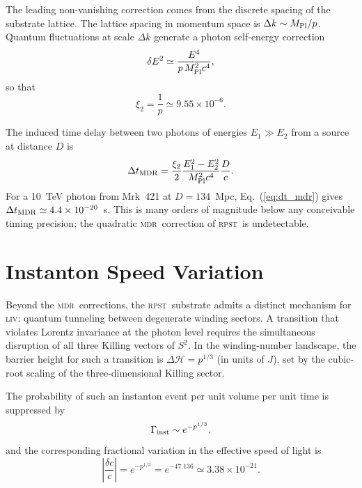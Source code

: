 \documentclass[aps,prd,twocolumn,showpacs,preprintnumbers]{revtex4-2}
\newcommand{\rpst}{\textsc{rpst}}
\newcommand{\Mpl}{M_{\rm Pl}}
\newcommand{\MDR}{\textsc{mdr}}
\newcommand{\LIV}{\textsc{liv}}
\newcommand{\abs}[1]{\left|#1\right|}
\begin{document}
The leading non-vanishing correction comes from the discrete spacing of the
substrate lattice.  The lattice spacing in momentum space is $\Delta k \sim
\Mpl/p$.  Quantum fluctuations at scale $\Delta k$ generate a photon
self-energy correction
\begin{equation}
  \delta E^2 \simeq \frac{E^4}{p\,\Mpl^2 c^4},
\end{equation}
so that
\begin{equation}
  \xi_2 = \frac{1}{p} \simeq 9.55 \times 10^{-6}.
\label{eq:xi2}
\end{equation}

The induced time delay between two photons of energies $E_1 \gg E_2$ from a
source at distance $D$ is
\begin{equation}
  \Delta t_{\rm MDR}
    = \frac{\xi_2}{2}\frac{E_1^2 - E_2^2}{\Mpl^2 c^4}\frac{D}{c}.
\label{eq:dt_mdr}
\end{equation}
For a 10~TeV photon from Mrk~421 at $D = 134$~Mpc,
Eq.~(\ref{eq:dt_mdr}) gives $\Delta t_{\rm MDR} \simeq 4.4 \times 10^{-20}$~s.
This is many orders of magnitude below any conceivable timing precision;
the quadratic \MDR\ correction of \rpst\ is undetectable.

\section{Instanton Speed Variation}
\label{sec:instanton}

Beyond the \MDR\ corrections, the \rpst\ substrate admits a distinct mechanism
for \LIV: quantum tunneling between degenerate winding sectors.  A transition
that violates Lorentz invariance at the photon level requires the simultaneous
disruption of all three Killing vectors of $S^2$.  In the winding-number
landscape, the barrier height for such a transition is $\Delta\mathcal{H} =
p^{1/3}$ (in units of $J$), set by the cubic-root scaling of the
three-dimensional Killing sector.

The probability of such an instanton event per unit volume per unit time is
suppressed by
\begin{equation}
  \Gamma_{\rm inst} \sim e^{-p^{1/3}},
\end{equation}
and the corresponding fractional variation in the effective speed of light is
\begin{equation}
  \abs{\frac{\delta c}{c}}
    = e^{-p^{1/3}}
    = e^{-47.136}
    \simeq 3.38 \times 10^{-21}.
\label{eq:deltac}
\end{equation}
\end{document}
